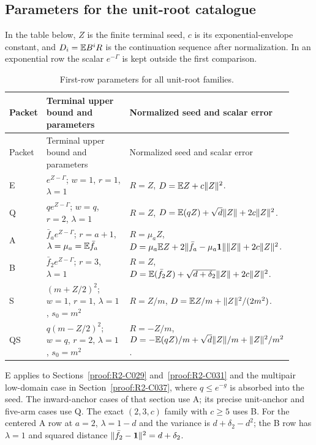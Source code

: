 \subsection{Parameters for the unit-root catalogue}
\label{sec:unit-two-step-applications}
In the table below, $Z$ is the finite terminal seed, $c$ is its
exponential-envelope constant, and $D_i=\mathbb E B^iR$ is the continuation
sequence after normalization. In an exponential row the scalar
$e^{-\Gamma}$ is kept outside the first comparison.
\begingroup\small
\setlength{\tabcolsep}{4pt}
\begin{longtable}{@{}p{0.13\linewidth}p{0.31\linewidth}p{0.48\linewidth}@{}}
\caption{First-row parameters for all unit-root families.}
\label{tab:unit-two-step:parameters}\\\toprule
Packet & Terminal upper bound and parameters & Normalized seed and scalar error \\
\midrule\endfirsthead
\toprule Packet & Terminal upper bound and parameters & Normalized seed and scalar error \\
\midrule\endhead\bottomrule\endfoot
E & $e^{Z-\Gamma}$; $w=1$, $r=1$, $\lambda=1$
  & $R=Z$, $D=\mathbb E Z+c\|Z\|^2$. \\
Q & $qe^{Z-\Gamma}$; $w=q$, $r=2$, $\lambda=1$
  & $R=Z$, $D=\mathbb E(qZ)+\sqrt d\|Z\|+2c\|Z\|^2$. \\
A & $\bar f_a e^{Z-\Gamma}$; $r=a+1$, $\lambda=\mu_a=\mathbb E\bar f_a$
  & $R=\mu_aZ$, $D=\mu_a\mathbb E Z+2\|\bar f_a-\mu_a\mathbf1\|\|Z\|+2c\|Z\|^2$. \\
B & $\bar f_2 e^{Z-\Gamma}$; $r=3$, $\lambda=1$
  & $R=Z$, $D=\mathbb E(\bar f_2 Z)+\sqrt{d+\delta_2}\|Z\|+2c\|Z\|^2$. \\
S & $(m+Z/2)^2$; $w=1$, $r=1$, $\lambda=1$, $s_0=m^2$
  & $R=Z/m$, $D=\mathbb E Z/m+\|Z\|^2/(2m^2)$. \\
QS & $q(m-Z/2)^2$; $w=q$, $r=2$, $\lambda=1$, $s_0=m^2$
  & $R=-Z/m$, $D=-\mathbb E(qZ)/m+\sqrt d\|Z\|/m+\|Z\|^2/m^2$. \\
\end{longtable}
\endgroup

E applies to Sections~\ref{proof:R2-C029} and~\ref{proof:R2-C031}
and the multipair low-domain case in Section~\ref{proof:R2-C037},
where $q\le e^{-g}$ is absorbed into the seed. The inward-anchor
cases of that section use A; its precise unit-anchor and five-arm
cases use Q. The exact $(2,3,c)$ family with $c\ge5$ uses B.
For the centered A row at $a=2$, $\lambda=1-d$ and the variance
is $d+\delta_2-d^2$; the B row has $\lambda=1$ and squared
distance $\|\bar f_2-\mathbf1\|^2=d+\delta_2$.

